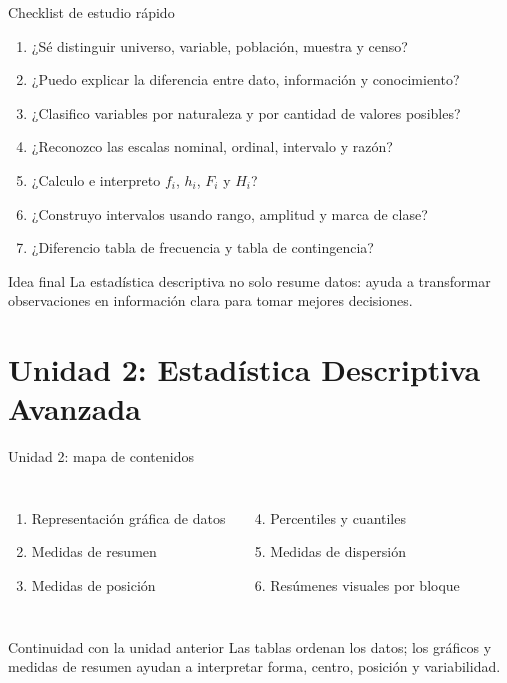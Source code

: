 \documentclass[aspectratio=169,11pt]{beamer}
\begin{document}
\begin{frame}{Checklist de estudio rápido}
\begin{enumerate}
  \item ¿Sé distinguir universo, variable, población, muestra y censo?
  \item ¿Puedo explicar la diferencia entre dato, información y conocimiento?
  \item ¿Clasifico variables por naturaleza y por cantidad de valores posibles?
  \item ¿Reconozco las escalas nominal, ordinal, intervalo y razón?
  \item ¿Calculo e interpreto $f_i$, $h_i$, $F_i$ y $H_i$?
  \item ¿Construyo intervalos usando rango, amplitud y marca de clase?
  \item ¿Diferencio tabla de frecuencia y tabla de contingencia?
\end{enumerate}
\end{frame}

\begin{frame}{Idea final}
\centering
\Large
La estadística descriptiva no solo resume datos: ayuda a transformar observaciones en información clara para tomar mejores decisiones.
\end{frame}


\section{Unidad 2: Estadística Descriptiva Avanzada}

\begin{frame}{Unidad 2: mapa de contenidos}
\begin{columns}[T]
\begin{enumerate}
  \item Representación gráfica de datos
  \item Medidas de resumen
  \item Medidas de posición
\end{enumerate}
\begin{enumerate}\setcounter{enumi}{3}
  \item Percentiles y cuantiles
  \item Medidas de dispersión
  \item Resúmenes visuales por bloque
\end{enumerate}
\end{columns}
\vspace{0.5em}
\begin{block}{Continuidad con la unidad anterior}
Las tablas ordenan los datos; los gráficos y medidas de resumen ayudan a interpretar forma, centro, posición y variabilidad.
\end{block}
\end{frame}
\end{document}
